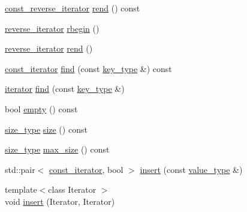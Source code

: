 \begin{DoxyCompactItemize}
\hyperlink{classnifty_1_1container_1_1FlatSet_ab7858d2e6eeeb311e21988d9b4a5b802}{const\+\_\+reverse\+\_\+iterator} \hyperlink{classnifty_1_1container_1_1FlatSet_adad37eee25033eb4210619e61808229f}{rend} () const
\item 
\hyperlink{classnifty_1_1container_1_1FlatSet_a5ad537835e3b8911ac1beed1a95d3ac2}{reverse\+\_\+iterator} \hyperlink{classnifty_1_1container_1_1FlatSet_a82523673d9285f43e73e90b37b00d105}{rbegin} ()
\item 
\hyperlink{classnifty_1_1container_1_1FlatSet_a5ad537835e3b8911ac1beed1a95d3ac2}{reverse\+\_\+iterator} \hyperlink{classnifty_1_1container_1_1FlatSet_ae40f27aa1a23e148de77b596825cb205}{rend} ()
\item 
\hyperlink{classnifty_1_1container_1_1FlatSet_a0f4cd26da060859b18742abfd534aa24}{const\+\_\+iterator} \hyperlink{classnifty_1_1container_1_1FlatSet_ad12a5bbeb3a6a3c29ab173fb0f9572c9}{find} (const \hyperlink{classnifty_1_1container_1_1FlatSet_a0101a4574052389646be8d9bf092a949}{key\+\_\+type} \&) const
\item 
\hyperlink{classnifty_1_1container_1_1FlatSet_a9c7fd20cd6b1878ccb8a7e068072c795}{iterator} \hyperlink{classnifty_1_1container_1_1FlatSet_ac78650ca9a84bc0a8324a9aa03f626d4}{find} (const \hyperlink{classnifty_1_1container_1_1FlatSet_a0101a4574052389646be8d9bf092a949}{key\+\_\+type} \&)
\item 
bool \hyperlink{classnifty_1_1container_1_1FlatSet_a543bb831ef2dd97b6906aabc34d606ac}{empty} () const
\item 
\hyperlink{classnifty_1_1container_1_1FlatSet_a06ddeba4c1be37279497ed698dfeb812}{size\+\_\+type} \hyperlink{classnifty_1_1container_1_1FlatSet_a6d265f3f83e18a1342a172acaf57a15c}{size} () const
\item 
\hyperlink{classnifty_1_1container_1_1FlatSet_a06ddeba4c1be37279497ed698dfeb812}{size\+\_\+type} \hyperlink{classnifty_1_1container_1_1FlatSet_a9f76cdc060ea18e60d7aceb506e5eece}{max\+\_\+size} () const
\item 
std\+::pair$<$ \hyperlink{classnifty_1_1container_1_1FlatSet_a0f4cd26da060859b18742abfd534aa24}{const\+\_\+iterator}, bool $>$ \hyperlink{classnifty_1_1container_1_1FlatSet_a3e59cfe8b3d5eb53750ef761cce7b652}{insert} (const \hyperlink{classnifty_1_1container_1_1FlatSet_a2366c665ec49d585ff8a77362468d82d}{value\+\_\+type} \&)
\item 
{\footnotesize template$<$class Iterator $>$ }\\void \hyperlink{classnifty_1_1container_1_1FlatSet_a2681201810070decb9eeb7f5beb47f0d}{insert} (Iterator, Iterator)

\end{DoxyCompactItemize}
